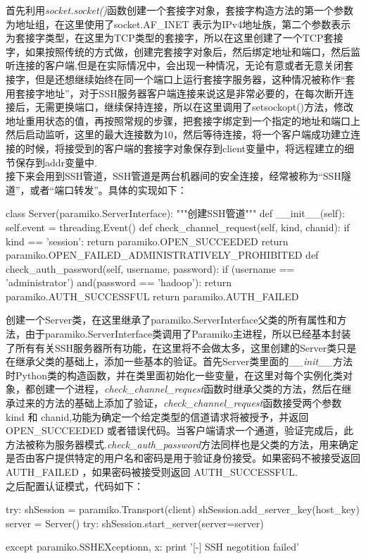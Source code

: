 \documentclass[UTF8,nofonts,a4paper]{ctexart}
\begin{document}
\indent 首先利用\textit{socket.socket()}函数创建一个套接字对象，套接字构造方法的第一个参数为地址组，在这里使用了socket.AF\_INET 表示为IPv4地址族，第二个参数表示为套接字类型，在这里为TCP类型的套接字，所以在这里创建了一个TCP套接字，如果按照传统的方式做，创建完套接字对象后，然后绑定地址和端口，然后监听连接的客户端,但是在实际情况中，会出现一种情况，无论有意或者无意关闭套接字，但是还想继续始终在同一个端口上运行套接字服务器，这种情况被称作“套用套接字地址”，对于SSH服务器客户端连接来说这是非常必要的，在每次断开连接后，无需更换端口，继续保持连接，所以在这里调用了setsockopt()方法，修改地址重用状态的值，再按照常规的步骤，把套接字绑定到一个指定的地址和端口上然后启动监听，这里的最大连接数为10，然后等待连接，将一个客户端成功建立连接的时候，将接受到的客户端的套接字对象保存到client变量中，将远程建立的细节保存到addr变量中.\\
\indent 接下来会用到SSH管道，SSH管道是两台机器间的安全连接，经常被称为“SSH隧道”，或者“端口转发”。具体的实现如下：
\begin{python}
class Server(paramiko.ServerInterface):
	"""创建SSH管道"""
	def __init__(self):
		self.event = threading.Event()		
	def check_channel_request(self, kind, chanid):
		if kind == 'session':
			return paramiko.OPEN_SUCCEEDED
		return paramiko.OPEN_FAILED_ADMINISTRATIVELY_PROHIBITED
	def check_auth_password(self, username, password):
		if (username == 'administrator') and(password == 'hadoop'):
			return paramiko.AUTH_SUCCESSFUL
		return paramiko.AUTH_FAILED
\end{python}

\indent 创建一个Server类，在这里继承了paramiko.ServerInterface父类的所有属性和方法，由于paramiko.ServerInterface类调用了Paramiko主进程，所以已经基本封装了所有有关SSH服务器所有功能，在这里将不会做太多，这里创建的Server类只是在继承父类的基础上，添加一些基本的验证。首先Server类里面的\textit{\_\_init\_\_}方法时Python类的构造函数，并在类里面初始化一些变量，在这里对每个实例化类对象，都创建一个进程，\textit{check\_channel\_request}函数时继承父类的方法，然后在继承过来的方法的基础上添加了验证，\textit{check\_channel\_request}函数接受两个参数 kind 和 chanid,功能为确定一个给定类型的信道请求将被授予，并返回OPEN\_SUCCEEDED 或者错误代码。当客户端请求一个通道，验证完成后，此方法被称为服务器模式.\textit{check\_auth\_password}方法同样也是父类的方法，用来确定是否由客户提供特定的用户名和密码是用于验证身份​​接受。如果密码不被接受返回AUTH\_FAILED ，如果密码被接受则返回 AUTH\_SUCCESSFUL.\\
\indent 之后配置认证模式，代码如下：
\begin{python}
try:
	shSession = paramiko.Transport(client)
	shSession.add_server_key(host_key)
	server = Server()
	try:
			shSession.start_server(server=server)
			
	except paramiko.SSHEXceptionn, x:
		print '[-] SSH negotition failed'
\end{python}
\end{document}
